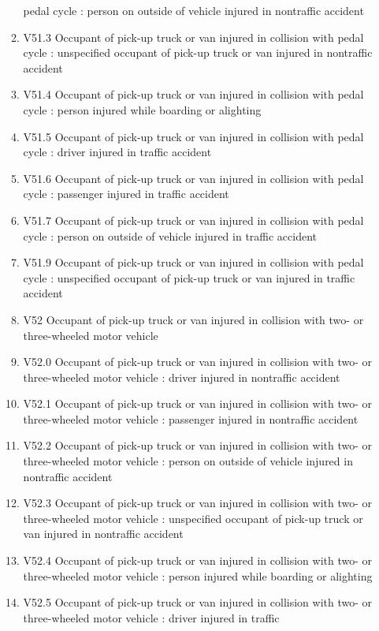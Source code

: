 \documentclass[
]{scrartcl}
\begin{document}
\begin{itemize}
\begin{enumerate}
    pedal cycle : person on outside of vehicle injured in nontraffic
    accident
  \item
    V51.3 Occupant of pick-up truck or van injured in collision with
    pedal cycle : unspecified occupant of pick-up truck or van injured
    in nontraffic accident
  \item
    V51.4 Occupant of pick-up truck or van injured in collision with
    pedal cycle : person injured while boarding or alighting
  \item
    V51.5 Occupant of pick-up truck or van injured in collision with
    pedal cycle : driver injured in traffic accident
  \item
    V51.6 Occupant of pick-up truck or van injured in collision with
    pedal cycle : passenger injured in traffic accident
  \item
    V51.7 Occupant of pick-up truck or van injured in collision with
    pedal cycle : person on outside of vehicle injured in traffic
    accident
  \item
    V51.9 Occupant of pick-up truck or van injured in collision with
    pedal cycle : unspecified occupant of pick-up truck or van injured
    in traffic accident
  \item
    V52 Occupant of pick-up truck or van injured in collision with two-
    or three-wheeled motor vehicle
  \item
    V52.0 Occupant of pick-up truck or van injured in collision with
    two- or three-wheeled motor vehicle : driver injured in nontraffic
    accident
  \item
    V52.1 Occupant of pick-up truck or van injured in collision with
    two- or three-wheeled motor vehicle : passenger injured in
    nontraffic accident
  \item
    V52.2 Occupant of pick-up truck or van injured in collision with
    two- or three-wheeled motor vehicle : person on outside of vehicle
    injured in nontraffic accident
  \item
    V52.3 Occupant of pick-up truck or van injured in collision with
    two- or three-wheeled motor vehicle : unspecified occupant of
    pick-up truck or van injured in nontraffic accident
  \item
    V52.4 Occupant of pick-up truck or van injured in collision with
    two- or three-wheeled motor vehicle : person injured while boarding
    or alighting
  \item
    V52.5 Occupant of pick-up truck or van injured in collision with
    two- or three-wheeled motor vehicle : driver injured in traffic

\end{enumerate}
\end{itemize}
\end{document}
